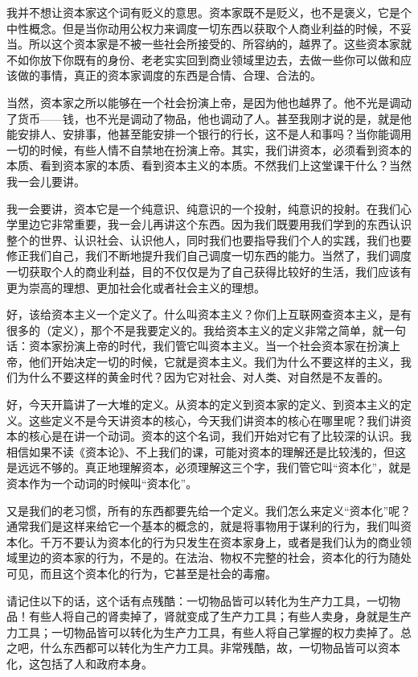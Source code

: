 \documentclass[UTF8, 12pt, a4paper]{ctexrep}
\begin{document}
我并不想让资本家这个词有贬义的意思。资本家既不是贬义，也不是褒义，它是个中性概念。但是当你动用公权力来调度一切东西以获取个人商业利益的时候，不妥当。所以这个资本家是不被一些社会所接受的、所容纳的，越界了。这些资本家就不如你放下你既有的身份、老老实实回到商业领域里边去，去做一些你可以做和应该做的事情，真正的资本家调度的东西是合情、合理、合法的。

当然，资本家之所以能够在一个社会扮演上帝，是因为他也越界了。他不光是调动了货币——钱，也不光是调动了物品，他也调动了人。甚至我刚才说的是，就是他能安排人、安排事，他甚至能安排一个银行的行长，这不是人和事吗？当你能调用一切的时候，有些人情不自禁地在扮演上帝。其实，我们讲资本，必须看到资本的本质、看到资本家的本质、看到资本主义的本质。不然我们上这堂课干什么？当然我一会儿要讲。

我一会要讲，资本它是一个纯意识、纯意识的一个投射，纯意识的投射。在我们心学里边它非常重要，我一会儿再讲这个东西。因为我们既要用我们学到的东西认识整个的世界、认识社会、认识他人，同时我们也要指导我们个人的实践，我们也要修正我们自己，我们不断地提升我们自己调度一切东西的能力。当然了，我们调度一切获取个人的商业利益，目的不仅仅是为了自己获得比较好的生活，我们应该有更为崇高的理想、更加社会化或者社会主义的理想。

好，该给资本主义一个定义了。什么叫资本主义？你们上互联网查资本主义，是有很多的（定义），那个不是我要定义的。我给资本主义的定义非常之简单，就一句话：资本家扮演上帝的时代，我们管它叫资本主义。当一个社会资本家在扮演上帝，他们开始决定一切的时候，它就是资本主义。我们为什么不要这样的主义，我们为什么不要这样的黄金时代？因为它对社会、对人类、对自然是不友善的。

好，今天开篇讲了一大堆的定义。从资本的定义到资本家的定义、到资本主义的定义。这些定义不是今天讲资本的核心，今天我们讲资本的核心在哪里呢？我们讲资本的核心是在讲一个动词。资本的这个名词，我们开始对它有了比较深的认识。我相信如果不读《资本论》、不上我们的课，可能对资本的理解还是比较浅的，但这是远远不够的。真正地理解资本，必须理解这三个字，我们管它叫“资本化”，就是资本作为一个动词的时候叫“资本化”。

又是我们的老习惯，所有的东西都要先给一个定义。我们怎么来定义“资本化”呢？通常我们是这样来给它一个基本的概念的，就是将事物用于谋利的行为，我们叫资本化。千万不要认为资本化的行为只发生在资本家身上，或者是我们认为的商业领域里边的资本家的行为，不是的。在法治、物权不完整的社会，资本化的行为随处可见，而且这个资本化的行为，它甚至是社会的毒瘤。

请记住以下的话，这个话有点残酷：一切物品皆可以转化为生产力工具，一切物品！有些人将自己的肾卖掉了，肾就变成了生产力工具；有些人卖身，身就是生产力工具；一切物品皆可以转化为生产力工具，有些人将自己掌握的权力卖掉了。总之吧，什么东西都可以转化为生产力工具。非常残酷，故，一切物品皆可以资本化，这包括了人和政府本身。
\end{document}
